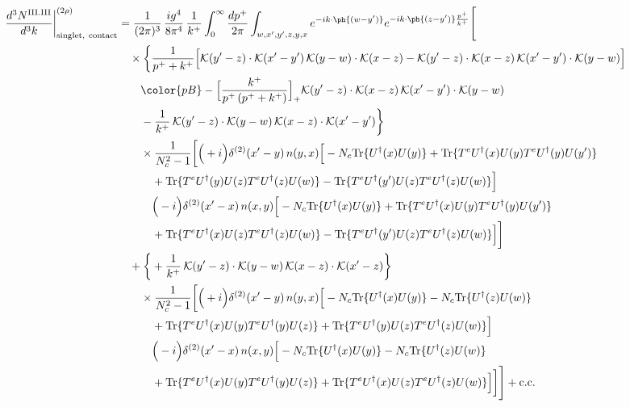 \begin{align}
\frac{d^{3}N^{\rm III.III}}{d^{3}k}\bigg|^{(2\rho)}_{\rm singlet,\ contact}&=\frac{1}{(2\pi)^{3}}\,\frac{ig^{4}}{8\pi^{4}}\,\frac{1}{k^{+}}\int_{0}^{\infty}\frac{dp^{+}}{2\pi}\int_{w,x',y',z,y,x}e^{-ik\cdot\ph{(w-y')}}e^{-ik\cdot\ph{(z-y')}\frac{p^{+}}{k^{+}}}\Bigg[\notag\\
&\quad\times\bigg\{\frac{1}{p^{+}+k^{+}}\Big[\mathcal{K}(y'-z)\cdot\mathcal{K}(x'-y')\,\mathcal{K}(y-w)\cdot\mathcal{K}(x-z)-\mathcal{K}(y'-z)\cdot\mathcal{K}(x-z)\,\mathcal{K}(x'-y')\cdot\mathcal{K}(y-w)\Big]\notag\\
&\qquad{\color{pB}-\Big[\frac{k^{+}}{p^{+}\,(p^{+}+k^{+})}\Big]_{+}\mathcal{K}(y'-z)\cdot\mathcal{K}(x-z)\,\mathcal{K}(x'-y')\cdot\mathcal{K}(y-w)}\notag\\
&\qquad-\frac{1}{k^{+}}\,\mathcal{K}(y'-z)\cdot\mathcal{K}(y-w)\,\mathcal{K}(x-z)\cdot\mathcal{K}(x'-y')\bigg\}\notag\\
&\qquad\times \frac{1}{N_{c}^{2}-1}\bigg[\Big(+i\Big)\delta^{(2)}(x'-y)\,n(y,x)\Big[-N_{c}{\rm Tr}\{U^{\dagger}(x)U(y)\}+{\rm Tr}\{T^{e}U^{\dagger}(x)U(y)T^{e}U^{\dagger}(y)U(y')\}\notag\\
&\qquad\quad +{\rm Tr}\{T^{e}U^{\dagger}(y)U(z)T^{e}U^{\dagger}(z)U(w)\}-{\rm Tr}\{T^{e}U^{\dagger}(y')U(z)T^{e}U^{\dagger}(z)U(w)\}\Big]\notag\\
&\qquad\quad \Big(-i\Big)\delta^{(2)}(x'-x)\,n(x,y)\Big[-N_{c}{\rm Tr}\{U^{\dagger}(x)U(y)\}+{\rm Tr}\{T^{e}U^{\dagger}(x)U(y)T^{e}U^{\dagger}(y)U(y')\}\notag\\
&\qquad\quad +{\rm Tr}\{T^{e}U^{\dagger}(x)U(z)T^{e}U^{\dagger}(z)U(w)\}-{\rm Tr}\{T^{e}U^{\dagger}(y')U(z)T^{e}U^{\dagger}(z)U(w)\}\Big]\bigg]\notag\\
&\quad+\bigg\{+\frac{1}{k^{+}}\,\mathcal{K}(y'-z)\cdot\mathcal{K}(y-w)\,\mathcal{K}(x-z)\cdot\mathcal{K}(x'-z)\bigg\}\notag\\
&\qquad\times \frac{1}{N_{c}^{2}-1}\bigg[\Big(+i\Big)\delta^{(2)}(x'-y)\,n(y,x)\Big[-N_{c}{\rm Tr}\{U^{\dagger}(x)U(y)\}-N_{c}{\rm Tr}\{U^{\dagger}(z)U(w)\}\notag\\
&\qquad\quad +{\rm Tr}\{T^{e}U^{\dagger}(x)U(y)T^{e}U^{\dagger}(y)U(z)\}+{\rm Tr}\{T^{e}U^{\dagger}(y)U(z)T^{e}U^{\dagger}(z)U(w)\}\Big]\notag\\
&\qquad\quad \Big(-i\Big)\delta^{(2)}(x'-x)\,n(x,y)\Big[-N_{c}{\rm Tr}\{U^{\dagger}(x)U(y)\}-N_{c}{\rm Tr}\{U^{\dagger}(z)U(w)\}\notag\\
&\qquad\quad +{\rm Tr}\{T^{e}U^{\dagger}(x)U(y)T^{e}U^{\dagger}(y)U(z)\}+{\rm Tr}\{T^{e}U^{\dagger}(x)U(z)T^{e}U^{\dagger}(z)U(w)\}\Big]\bigg]\Bigg]+{\rm c.c.}\label{eq:E-III.III-2}
\end{align}
